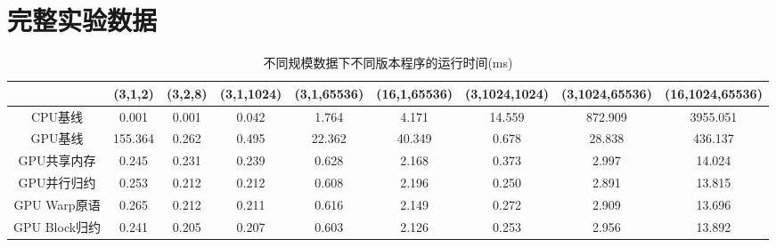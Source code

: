 \documentclass[logo,reportComp]{thesis}
\begin{document}

\appendix
\appendixconfig
\section{完整实验数据}
\label{appendix:exp}
\begin{table}[H]
\centering
\caption{不同规模数据下不同版本程序的运行时间(ms)}
\scriptsize
\begin{tabular}{ccccccccc}\hline
 & (3,1,2) & (3,2,8) & (3,1,1024) & (3,1,65536) & (16,1,65536) & (3,1024,1024) & (3,1024,65536) & (16,1024,65536)\\\hline
CPU基线 & 0.001 & 0.001 & 0.042 & 1.764 & 4.171 & 14.559 & 872.909 & 3955.051\\\hline
GPU基线 & 155.364 & 0.262 & 0.495 & 22.362 & 40.349 & 0.678 & 28.838 & 436.137\\\hline
GPU共享内存 & 0.245 & 0.231 & 0.239 & 0.628 & 2.168 & 0.373 & 2.997 & 14.024\\\hline
GPU并行归约 & 0.253 & 0.212 & 0.212 & 0.608 & 2.196 & 0.250 & 2.891 & 13.815\\\hline
GPU Warp原语 & 0.265 & 0.212 & 0.211 & 0.616 & 2.149 & 0.272 & 2.909 & 13.696\\\hline
GPU Block归约 & 0.241 & 0.205 & 0.207 & 0.603 & 2.126 & 0.253 & 2.956 & 13.892\\\hline
\end{tabular}
\end{table}
\end{document}
